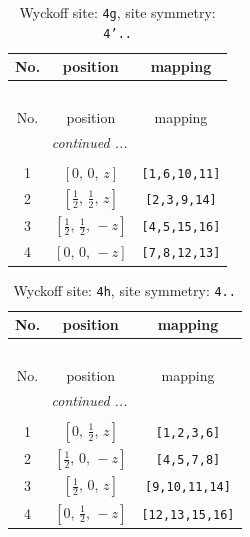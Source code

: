\documentclass[fleqn,8pt]{jsarticle}
\begin{document}
\renewcommand{\arraystretch}{1.2}
\begin{longtable}{ccc}
\caption{Wyckoff site: {\tt 4g}, site symmetry: {\tt 4'..}}
 \\
 \hline \hline
No. & position & mapping \\ \hline \endfirsthead

\multicolumn{2}{l}{\tablename\ \thetable{}} \\
 \hline \hline
No. & position & mapping \\ \hline \endhead

 \hline \hline
\multicolumn{2}{r}{\footnotesize\it continued ...} \\ \endfoot

 \hline \hline
\multicolumn{2}{r}{} \\ \endlastfoot

1 & $\left[ 0,\, 0,\, z \right]$ & {\tt [1,6,10,11]} \\ \hline
2 & $\left[ \frac{1}{2},\, \frac{1}{2},\, z \right]$ & {\tt [2,3,9,14]} \\ \hline
3 & $\left[ \frac{1}{2},\, \frac{1}{2},\, - z \right]$ & {\tt [4,5,15,16]} \\ \hline
4 & $\left[ 0,\, 0,\, - z \right]$ & {\tt [7,8,12,13]} \\
\end{longtable}
\renewcommand{\arraystretch}{1.2}
\begin{longtable}{ccc}
\caption{Wyckoff site: {\tt 4h}, site symmetry: {\tt 4..}}
 \\
 \hline \hline
No. & position & mapping \\ \hline \endfirsthead

\multicolumn{2}{l}{\tablename\ \thetable{}} \\
 \hline \hline
No. & position & mapping \\ \hline \endhead

 \hline \hline
\multicolumn{2}{r}{\footnotesize\it continued ...} \\ \endfoot

 \hline \hline
\multicolumn{2}{r}{} \\ \endlastfoot

1 & $\left[ 0,\, \frac{1}{2},\, z \right]$ & {\tt [1,2,3,6]} \\ \hline
2 & $\left[ \frac{1}{2},\, 0,\, - z \right]$ & {\tt [4,5,7,8]} \\ \hline
3 & $\left[ \frac{1}{2},\, 0,\, z \right]$ & {\tt [9,10,11,14]} \\ \hline
4 & $\left[ 0,\, \frac{1}{2},\, - z \right]$ & {\tt [12,13,15,16]} \\
\end{longtable}
\end{document}

